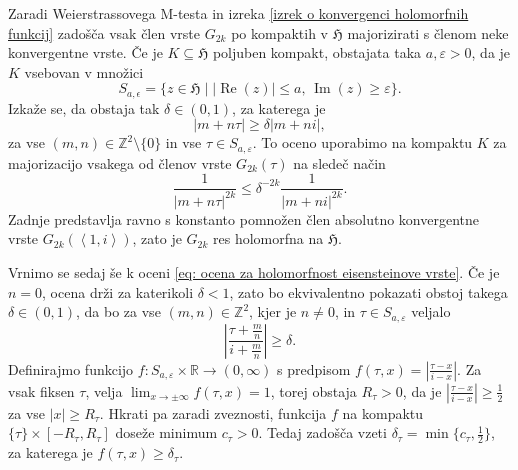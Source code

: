 \documentclass[mat1]{fmfdelo}
\numberwithin{equation}{section}
\newcommand{\R}{\mathbb R}
\newcommand{\Z}{\mathbb Z}
\newcommand{\HH}{\mathfrak{H}}
\newcommand{\abs}[1]{\left\lvert #1 \right\rvert}
\newcommand{\lattice}[2]{\left\langle #1, #2 \right\rangle}
\renewcommand\Re{\operatorname{Re}}%
\renewcommand\Im{\operatorname{Im}}%
\theoremstyle{definition}
\begin{document}
\begin{dokaz}
    Zaradi Weierstrassovega M-testa in izreka \ref{izrek o konvergenci holomorfnih funkcij} zadošča vsak člen vrste $G_{2k}$ po kompaktih v $\HH$ majorizirati s členom neke konvergentne vrste. Če je $K \subseteq \HH$ poljuben kompakt, obstajata taka $a, \varepsilon > 0$, da je $K$ vsebovan v množici 
    \[
        S_{a,\epsilon} = \{z \in \HH \mid \abs{\Re(z)} \leq a \text{, } \Im(z) \geq \varepsilon \}.
    \]
    Izkaže se, da obstaja tak $\delta \in (0,1)$, za katerega je
    \begin{equation}
        \label{eq: ocena za holomorfnost eisensteinove vrste}
        \abs{m + n\tau} \geq \delta\abs{m + ni},  
    \end{equation}
    za vse $(m, n) \in \Z^2\setminus\{0\}$ in vse $\tau \in S_{a,\varepsilon}$. To oceno uporabimo na kompaktu $K$ za majorizacijo vsakega od členov vrste $G_{2k}(\tau)$ na sledeč način
    \[
        \frac{1}{\abs{m + n\tau}^{2k}} \leq \delta^{-2k}\frac{1}{\abs{m + ni}^{2k}}.
    \]
    Zadnje predstavlja ravno s konstanto pomnožen člen absolutno konvergentne vrste $G_{2k}(\lattice{1}{i})$, zato je $G_{2k}$ res holomorfna na $\HH$.


    Vrnimo se sedaj še k oceni \eqref{eq: ocena za holomorfnost eisensteinove vrste}. Če je $n = 0$, ocena drži za katerikoli $\delta < 1$, zato bo ekvivalentno pokazati obstoj takega $\delta \in (0,1)$, da bo za vse $(m,n) \in \Z^2$, kjer je $n \neq 0$, in $\tau \in S_{a,\varepsilon}$ veljalo
    \[
        \abs{\frac{\tau + \tfrac{m}{n}}{i + \tfrac{m}{n}}} \geq \delta.
    \]
    Definirajmo funkcijo $f: S_{a, \varepsilon} \times \R \to (0,\infty)$ s predpisom $f(\tau, x) = \abs{\tfrac{\tau - x}{i - x}}$. Za vsak fiksen $\tau$, velja $\lim_{x \to \pm\infty} f(\tau, x) = 1$, torej obstaja $R_\tau > 0$, da je $\abs{\tfrac{\tau - x}{i - x}} \geq \tfrac{1}{2}$ za vse $\abs{x} \geq R_\tau$. Hkrati pa zaradi zveznosti, funkcija $f$ na kompaktu $\{\tau\} \times [-R_\tau, R_\tau]$ doseže minimum $c_\tau > 0$. Tedaj zadošča vzeti $\delta_\tau = \min\{c_\tau, \tfrac{1}{2}\}$, za katerega je $f(\tau, x) \geq \delta_\tau$.


\end{dokaz}
\end{document}
